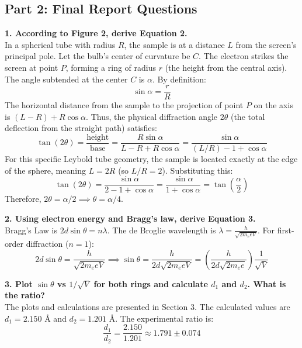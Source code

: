 \documentclass[a4paper,11pt]{article}
\begin{document}
\subsection*{Part 2: Final Report Questions}

\noindent\textbf{1. According to Figure 2, derive Equation 2.} \\
In a spherical tube with radius $R$, the sample is at a distance $L$ from the screen's principal pole. Let the bulb's center of curvature be $C$. The electron strikes the screen at point $P$, forming a ring of radius $r$ (the height from the central axis). The angle subtended at the center $C$ is $\alpha$.
By definition:
\begin{equation*}
    \sin\alpha = \frac{r}{R}
\end{equation*}
The horizontal distance from the sample to the projection of point $P$ on the axis is $(L - R) + R\cos\alpha$. Thus, the physical diffraction angle $2\theta$ (the total deflection from the straight path) satisfies:
\begin{equation*}
    \tan(2\theta) = \frac{\text{height}}{\text{base}} = \frac{R\sin\alpha}{L - R + R\cos\alpha} = \frac{\sin\alpha}{(L/R) - 1 + \cos\alpha}
\end{equation*}
For this specific Leybold tube geometry, the sample is located exactly at the edge of the sphere, meaning $L = 2R$ (so $L/R = 2$). Substituting this:
\begin{equation*}
    \tan(2\theta) = \frac{\sin\alpha}{2 - 1 + \cos\alpha} = \frac{\sin\alpha}{1 + \cos\alpha} = \tan\left(\frac{\alpha}{2}\right)
\end{equation*}
Therefore, $2\theta = \alpha/2 \implies \theta = \alpha/4$.

\noindent\textbf{2. Using electron energy and Bragg's law, derive Equation 3.} \\
Bragg's Law is $2d\sin\theta = n\lambda$. The de Broglie wavelength is $\lambda = \frac{h}{\sqrt{2m_e eV}}$. For first-order diffraction ($n=1$):
\begin{equation*}
    2d\sin\theta = \frac{h}{\sqrt{2m_e eV}} \implies \sin\theta = \frac{h}{2d\sqrt{2m_e eV}} = \left( \frac{h}{2d\sqrt{2m_e e}} \right) \frac{1}{\sqrt{V}}
\end{equation*}

\noindent\textbf{3. Plot $\sin\theta$ vs $1/\sqrt{V}$ for both rings and calculate $d_1$ and $d_2$. What is the ratio?} \\
The plots and calculations are presented in Section 3. The calculated values are $d_1 = 2.150\text{ \AA}$ and $d_2 = 1.201\text{ \AA}$. 
The experimental ratio is:
\begin{equation*}
    \frac{d_1}{d_2} = \frac{2.150}{1.201} \approx 1.791 \pm 0.074
\end{equation*}
\end{document}
